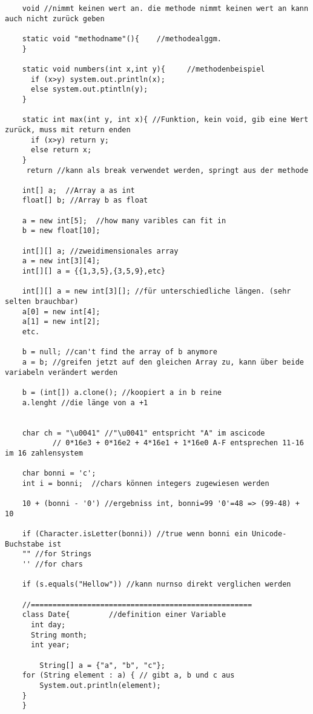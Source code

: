 \documentclass[a4paper,12pt]{article}
\begin{document}
\begin{lstlisting}
    void //nimmt keinen wert an. die methode nimmt keinen wert an kann auch nicht zurück geben

    static void "methodname"(){    //methodealggm.
    }

    static void numbers(int x,int y){     //methodenbeispiel
      if (x>y) system.out.println(x);
      else system.out.ptintln(y);
    }

    static int max(int y, int x){ //Funktion, kein void, gib eine Wert zurück, muss mit return enden
      if (x>y) return y;
      else return x;
    }
     return //kann als break verwendet werden, springt aus der methode

    int[] a;  //Array a as int
    float[] b; //Array b as float

    a = new int[5];  //how many varibles can fit in
    b = new float[10]; 

    int[][] a; //zweidimensionales array
    a = new int[3][4];
    int[][] a = {{1,3,5},{3,5,9},etc}

    int[][] a = new int[3][]; //für unterschiedliche längen. (sehr selten brauchbar)
    a[0] = new int[4];
    a[1] = new int[2];
    etc.

    b = null; //can't find the array of b anymore
    a = b; //greifen jetzt auf den gleichen Array zu, kann über beide variabeln verändert werden

    b = (int[]) a.clone(); //koopiert a in b reine
    a.lenght //die länge von a +1


    char ch = "\u0041" //"\u0041" entspricht "A" im ascicode
           // 0*16e3 + 0*16e2 + 4*16e1 + 1*16e0 A-F entsprechen 11-16 im 16 zahlensystem

    char bonni = 'c';
    int i = bonni;  //chars können integers zugewiesen werden

    10 + (bonni - '0') //ergebniss int, bonni=99 '0'=48 => (99-48) + 10

    if (Character.isLetter(bonni)) //true wenn bonni ein Unicode-Buchstabe ist
    "" //for Strings
    '' //for chars

    if (s.equals("Hellow")) //kann nurnso direkt verglichen werden

    //===================================================
    class Date{         //definition einer Variable
      int day;
      String month;
      int year;

        String[] a = {"a", "b", "c"};
    for (String element : a) { // gibt a, b und c aus
        System.out.println(element);
    }
    }


\end{lstlisting}
\end{document}

